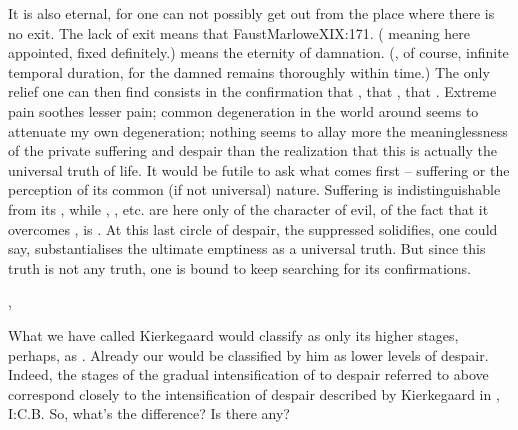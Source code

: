 It is also eternal, for one can not possibly get out from the place where there
is no  exit. The lack of exit means that \citet{no end is limited to
  damned souls,}{FaustMarlowe}{XIX:171. ( meaning here appointed, fixed
  definitely.)} means the eternity of damnation. (, of
course, infinite temporal duration, for the damned remains thoroughly within
time.)  The only relief one can then find consists in the confirmation that
, that , that .  Extreme pain soothes lesser pain; common degeneration in the world
around seems to attenuate my own degeneration; nothing seems to allay more the
meaninglessness of the private suffering and despair than the realization that
this is actually the universal truth of life. It would be futile to ask what
comes first -- suffering or the perception of its common (if not universal)
nature. Suffering is indistinguishable from its , while
, , etc. are here only  of
the  character of evil, of the fact that it overcomes , is
.  At this last circle of despair, the suppressed
 solidifies, one could say, {substantialises} the ultimate emptiness
as a universal truth. But since this  truth is not any truth, one is
bound to keep searching for its confirmations.




\sep

\pa What we have called  Kierkegaard would classify as only its
higher stages, perhaps, as . Already our  would be classified by him as lower levels
of despair. Indeed, the stages of the gradual intensification of  to
despair referred to above correspond closely to the intensification of despair
described by Kierkegaard in , I:C.B. 
So, what's the difference? Is there any?

